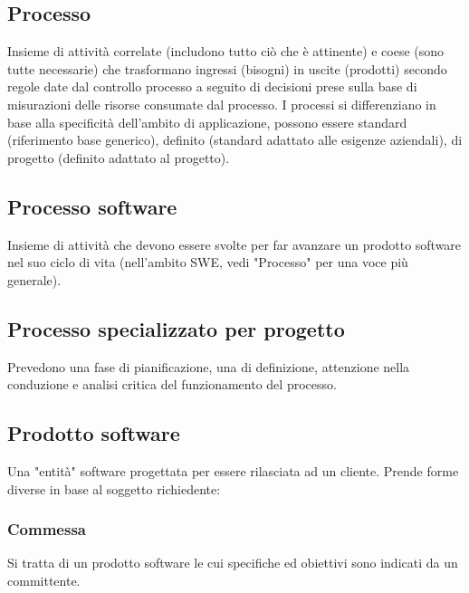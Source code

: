 	\subsection{Processo}	
	\label{sec:processi}
	Insieme di attività correlate (includono tutto ciò che è attinente) e coese (sono tutte necessarie) che trasformano ingressi (bisogni) in uscite (prodotti) secondo regole date dal controllo processo a seguito di decisioni prese sulla base di misurazioni delle risorse consumate dal processo.
	I processi si differenziano in base alla specificità dell'ambito di applicazione, possono essere standard (riferimento base generico), definito (standard adattato alle esigenze aziendali), di progetto (definito adattato al progetto).
	
	\subsection{Processo software}
	\label{sec:processisoftware}
	Insieme di attività che devono essere svolte per far avanzare un prodotto software nel suo ciclo di vita (nell'ambito SWE, vedi "Processo" per una voce più generale).

	\subsection{Processo specializzato per progetto}
	\label{sec:processispecializzati}
	Prevedono una fase di pianificazione, una di definizione, attenzione nella conduzione e analisi critica del funzionamento del processo.
	
	\subsection{Prodotto software}
	\label{sec:prodottosoftware}
	Una "entità" software progettata per essere rilasciata ad un cliente.
	Prende forme diverse in base al soggetto richiedente:
		
		\subsubsection{Commessa}
		Si tratta di un prodotto software le cui specifiche ed obiettivi sono indicati da un committente.
	

